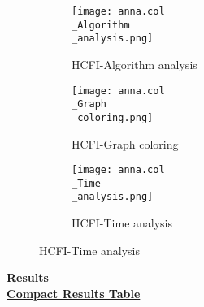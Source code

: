 \documentclass[10pt]{article}
\begin{document}
\graphicspath{{./Core1/Solutions/HCFI/anna.col}}
\begin{figure}[H]
\begin{subfigure}{.33\textwidth}
  \centering
  \texttt{[image: anna.col\\\_Algorithm\\\_analysis.png]}
  \caption{HCFI-Algorithm analysis}
   \label{fig:subfig1}
\end{subfigure}%
\begin{subfigure}{.33\textwidth}
  \centering
  \texttt{[image: anna.col\\\_Graph\\\_coloring.png]}
  \caption{HCFI-Graph coloring}
  \label{fig:subfig2}
\end{subfigure}
\begin{subfigure}{.33\textwidth}
  \centering
  \texttt{[image: anna.col\\\_Time\\\_analysis.png]}
  \caption{HCFI-Time analysis}
  \end{subfigure}
\end{figure}
\vspace{2cm}
\begin{center}
\hyperlink{page.8}{\textbf{Results}}\\
\vspace{0.5cm}
\hyperlink{page.71}{\textbf{Compact Results Table}}
\end{center}
\pagebreak
\end{document}
